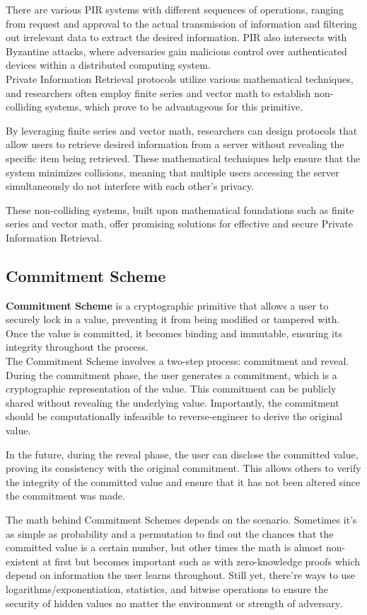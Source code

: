 \documentclass[12pt]{extarticle}
\begin{document}
There are various PIR systems with different sequences of operations, ranging from request and approval to the actual transmission of information and filtering out irrelevant data to extract the desired information. PIR also intersects with Byzantine attacks, where adversaries gain malicious control over authenticated devices within a distributed computing system.\cite{src7} \\
Private Information Retrieval protocols utilize various mathematical techniques, and researchers often employ finite series and vector math to establish non-colliding systems, which prove to be advantageous for this primitive.

By leveraging finite series and vector math, researchers can design protocols that allow users to retrieve desired information from a server without revealing the specific item being retrieved. These mathematical techniques help ensure that the system minimizes collisions, meaning that multiple users accessing the server simultaneously do not interfere with each other's privacy.

These non-colliding systems, built upon mathematical foundations such as finite series and vector math, offer promising solutions for effective and secure Private Information Retrieval.

\subsection{Commitment Scheme}
\textbf{Commitment Scheme} is a cryptographic primitive that allows a user to securely lock in a value, preventing it from being modified or tampered with. Once the value is committed, it becomes binding and immutable, ensuring its integrity throughout the process.\cite{src7}\\
The Commitment Scheme involves a two-step process: commitment and reveal. During the commitment phase, the user generates a commitment, which is a cryptographic representation of the value. This commitment can be publicly shared without revealing the underlying value. Importantly, the commitment should be computationally infeasible to reverse-engineer to derive the original value.

In the future, during the reveal phase, the user can disclose the committed value, proving its consistency with the original commitment. This allows others to verify the integrity of the committed value and ensure that it has not been altered since the commitment was made.

The math behind Commitment Schemes depends on the scenario. Sometimes it's as simple as probability and a permutation to find out the chances that the committed value is a certain number, but other times the math is almost non-existent at first but becomes important such as with zero-knowledge proofs which depend on information the user learns throughout. Still yet, there're ways to use logarithms/exponentiation, statistics, and bitwise operations to ensure the security of hidden values no matter the environment or strength of adversary.
\end{document}
